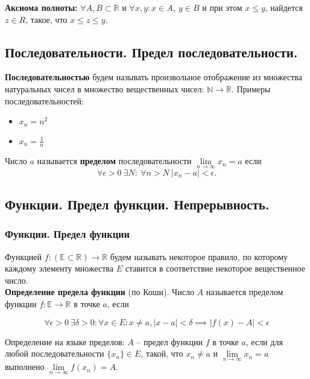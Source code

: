 \documentclass{article}
\begin{document}
\textbf{Аксиома полноты:} $\forall A, B \subset \mathbb{R}$ и $\forall x,y: x \in A, \ y \in B$ и при этом $x \le y$, найдется $z \in R$, такое, что $x \le z \le y$.

\subsection{Последовательности. Предел последовательности.}

\textbf{Последовательностью} будем называть произвольное отображение из множества натуральных чисел в множество вещественных чисел: $\mathbb{N} \to \mathbb{R}$. Примеры последовательностей:

\begin{itemize}
	\item $x_n = n^2$
	\item $x_n = \frac{1}{n}$
\end{itemize}

Число $a$ называется \textbf{пределом} последовательности $\lim\limits_{n \to \infty} x_n = a$ если $$ \forall \epsilon > 0 \ \exists N :  \ \forall n > N \ |x_n - a| < \epsilon.$$

\subsection{Функции. Предел функции. Непрерывность.}

\subsubsection{Функции. Предел функции}

Функцией $f : \left(\mathbb{E} \subset \mathbb{R}\right) \to \mathbb{R}$ будем называть некоторое правило, по которому каждому элементу множества $E$ ставится в соответствие некоторое вещественное число. \\

\textbf{Определение предела функции} (по Коши). Число $A$ называется пределом функции $f : \mathbb{E} \to \mathbb{R}$ в точке $a$, если 

$$ \forall \epsilon > 0 \ \exists \delta > 0 : \forall x \in E : x \ne a, |x - a| < \delta \implies |f(x) - A| < \epsilon $$

Определение на языке пределов: $A$ -- предел функции $f$ в точке $a$, если для любой последовательности $\{x_n\} \in E$, такой, что $x_n \ne a$ и $\lim\limits_{n \to \infty} x_n = a$ выполнено $\lim\limits_{n \to \infty} f(x_n) = A$. \\
\end{document}
